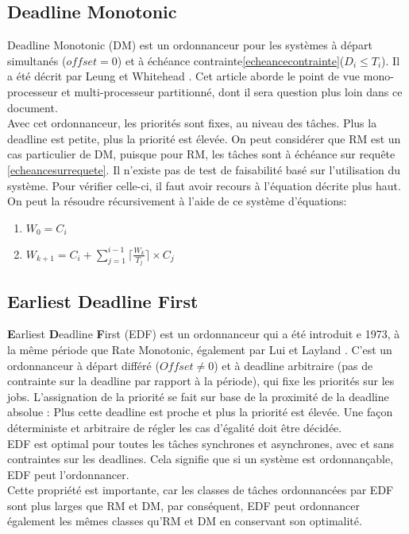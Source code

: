 \documentclass[11pt,a4paper,oneside]{report}
\begin{document}
\subsection{Deadline Monotonic}
Deadline Monotonic (DM) est un ordonnanceur pour les systèmes à départ simultanés ($offset = 0$) et 
à échéance contrainte\ref{echeancecontrainte}($D_i \leq T_i$). Il a été décrit par Leung et Whitehead 
\cite{leung_complexity_1982}. Cet article aborde le point de vue mono-processeur et multi-processeur partitionné, 
dont il sera question plus loin dans ce document.\\

Avec cet ordonnanceur, les priorités sont fixes, au niveau des tâches.
Plus la deadline est petite, plus la priorité est élevée. On peut considérer que RM est 
un cas particulier de DM, puisque pour RM, les tâches sont à échéance sur requête \ref{echeancesurrequete}.
Il n'existe pas de test de faisabilité basé sur l'utilisation du système. Pour vérifier celle-ci, 
il faut avoir recours à l'équation décrite plus haut. 
On peut la résoudre récursivement à l'aide de ce système d'équations: \\
\begin{enumerate}
	\item $W_0 = C_i $
	\item $W_{k+1} = C_i + \sum_{j = 1}^{i-1}\lceil \frac{W_k}{T_j} \rceil \times C_j $
\end{enumerate}



\subsection{Earliest Deadline First}
\textbf{E}arliest \textbf{D}eadline \textbf{F}irst (EDF) est un ordonnanceur 
qui a été introduit e 1973, à la même période que Rate Monotonic, également 
par Lui et Layland \cite{liu_scheduling_1973}. C'est un ordonnanceur à départ différé ($Offset \neq 0$) 
et à deadline arbitraire (pas de contrainte sur la deadline par rapport à la période), 
qui fixe les priorités sur les jobs. L'assignation de la priorité se fait sur base de 
la proximité de la deadline absolue : Plus cette deadline est proche et plus la priorité est élevée. 
Une façon déterministe et arbitraire de régler les cas d'égalité doit être décidée.
\cite{ndoye_ordonnancement_2014}\\

EDF est optimal pour toutes les tâches synchrones et asynchrones, avec et sans 
contraintes sur les deadlines. 
Cela signifie que si un système est ordonnançable, EDF peut l'ordonnancer.\\
Cette propriété est importante, car les classes de tâches ordonnancées par EDF 
sont plus larges que RM et DM, par conséquent, EDF peut ordonnancer également les 
mêmes classes qu'RM et DM en conservant son optimalité. \\
\end{document}
